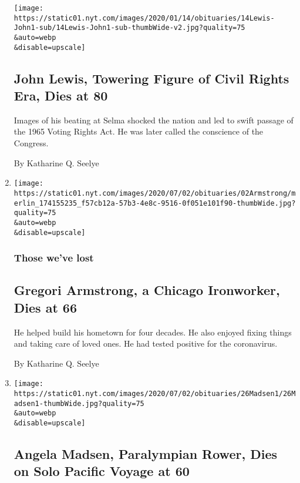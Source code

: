 \begin{enumerate}
  \texttt{[image: https://static01.nyt.com/images/2020/01/14/obituaries/14Lewis-John1-sub/14Lewis-John1-sub-thumbWide-v2.jpg?quality=75\\\&auto=webp\\\&disable=upscale]}

  \hypertarget{john-lewis-towering-figure-of-civil-rights-era-dies-at-80}{%
  \subsection{John Lewis, Towering Figure of Civil Rights Era, Dies at
  80}\label{john-lewis-towering-figure-of-civil-rights-era-dies-at-80}}

  Images of his beating at Selma shocked the nation and led to swift
  passage of the 1965 Voting Rights Act. He was later called the
  conscience of the Congress.

  By Katharine Q. Seelye
\item
  \href{/2020/07/02/us/gregori-armstrong-dead-coronavirus.html}{}

  \texttt{[image: https://static01.nyt.com/images/2020/07/02/obituaries/02Armstrong/merlin\_174155235\_f57cb12a-57b3-4e8c-9516-0f051e101f90-thumbWide.jpg?quality=75\\\&auto=webp\\\&disable=upscale]}

  \hypertarget{those-weve-lost-1}{%
  \subsubsection{Those we've lost}\label{those-weve-lost-1}}

  \hypertarget{gregori-armstrong-a-chicago-ironworker-dies-at-66}{%
  \subsection{Gregori Armstrong, a Chicago Ironworker, Dies at
  66}\label{gregori-armstrong-a-chicago-ironworker-dies-at-66}}

  He helped build his hometown for four decades. He also enjoyed fixing
  things and taking care of loved ones. He had tested positive for the
  coronavirus.

  By Katharine Q. Seelye
\item
  \href{/2020/06/30/sports/olympics/angela-madsen-paralympian-dead.html}{}

  \texttt{[image: https://static01.nyt.com/images/2020/07/02/obituaries/26Madsen1/26Madsen1-thumbWide.jpg?quality=75\\\&auto=webp\\\&disable=upscale]}

  \hypertarget{angela-madsen-paralympian-rower-dies-on-solo-pacific-voyage-at-60}{%
  \subsection{Angela Madsen, Paralympian Rower, Dies on Solo Pacific
  Voyage at
  60}\label{angela-madsen-paralympian-rower-dies-on-solo-pacific-voyage-at-60}}


\end{enumerate}
